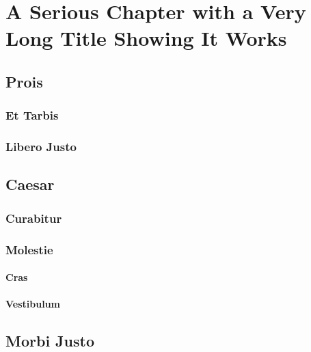 \chapter{A Serious Chapter with a Very Long Title Showing It Works}\label{sec:long}

\lipsum[2]

\section{Prois}

\lipsum[3-4]

\subsection{Et Tarbis}

\lipsum[5-8]

\subsection{Libero Justo}

\lipsum[9-12]

\section{Caesar}

\lipsum[13-15]

\subsection{Curabitur}

\lipsum[16-27]

\subsection{Molestie}

\lipsum[28]

\subsubsection{Cras}

\lipsum[29-38]

\subsubsection{Vestibulum}

\lipsum[39-47]

\section{Morbi Justo}

\lipsum[48-71]